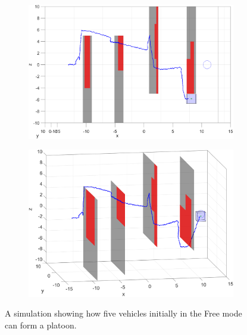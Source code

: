 \begin{figure}
  \begin{subfigure}[t]{0.4\textwidth} \label{subfig:sim_3}
    \includegraphics[width=\columnwidth]{fig/1042}
    \caption{}
  \end{subfigure}
  \begin{subfigure}[t]{0.4\textwidth} \label{subfig:sim_4}
    \includegraphics[width=\columnwidth]{fig/1173}
    \caption{}
  \end{subfigure}   
  \caption{A simulation showing how five vehicles initially in the Free mode can form a platoon. \label{fig:fp}}
\end{figure}